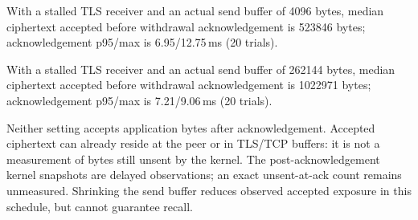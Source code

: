 With a stalled TLS receiver and an actual send buffer of 4096 bytes, median ciphertext accepted before withdrawal acknowledgement is 523846 bytes; acknowledgement p95/max is 6.95/12.75\,ms (20 trials).

With a stalled TLS receiver and an actual send buffer of 262144 bytes, median ciphertext accepted before withdrawal acknowledgement is 1022971 bytes; acknowledgement p95/max is 7.21/9.06\,ms (20 trials).

Neither setting accepts application bytes after acknowledgement. Accepted ciphertext can already reside at the peer or in TLS/TCP buffers: it is not a measurement of bytes still unsent by the kernel. The post-acknowledgement kernel snapshots are delayed observations; an exact unsent-at-ack count remains unmeasured. Shrinking the send buffer reduces observed accepted exposure in this schedule, but cannot guarantee recall.
